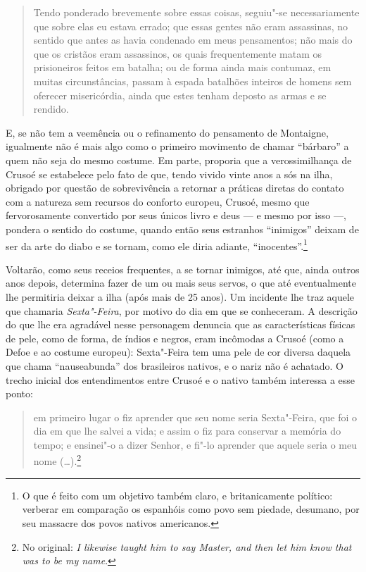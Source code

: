\begin{quote}
Tendo ponderado brevemente sobre essas coisas, seguiu"-se necessariamente
que sobre elas eu estava errado; que essas gentes não eram assassinas,
no sentido que antes as havia condenado em meus pensamentos; não mais do
que os cristãos eram assassinos, os quais frequentemente matam os
prisioneiros feitos em batalha; ou de forma ainda mais contumaz, em
muitas circunstâncias, passam à espada batalhões inteiros de homens sem
oferecer misericórdia, ainda que estes tenham deposto as armas e se
rendido.
\end{quote}

E, se não tem a veemência ou o refinamento do pensamento de Montaigne,
igualmente não é mais algo como o primeiro movimento de chamar
``bárbaro'' a quem não seja do mesmo costume. Em parte, proporia que a
verossimilhança de Crusoé se estabelece pelo fato de que, tendo vivido
vinte anos a sós na ilha, obrigado por questão de sobrevivência a
retornar a práticas diretas do contato com a natureza sem recursos do
conforto europeu, Crusoé, mesmo que fervorosamente convertido por seus
únicos livro e deus --- e mesmo por isso ---, pondera o sentido do
costume, quando então seus estranhos ``inimigos'' deixam de ser da arte
do diabo e se tornam, como ele diria adiante, ``inocentes''.\footnote{O
  que é feito com um objetivo também claro, e britanicamente político:
  verberar em comparação os espanhóis como povo sem piedade, desumano,
  por seu massacre dos povos nativos americanos.}

Voltarão, como seus receios frequentes, a se tornar inimigos, até que,
ainda outros anos depois, determina fazer de um ou mais seus servos, o
que até eventualmente lhe permitiria deixar a ilha (após mais de 25
anos). Um incidente lhe traz aquele que chamaria \emph{Sexta"-Feira}, por
motivo do dia em que se conheceram. A descrição do que lhe era agradável
nesse personagem denuncia que as características físicas de pele, como
de forma, de índios e negros, eram incômodas a Crusoé (como a Defoe e ao
costume europeu): Sexta"-Feira tem uma pele de cor diversa daquela que
chama ``nauseabunda'' dos brasileiros nativos, e o nariz não é achatado.
O trecho inicial dos entendimentos entre Crusoé e o nativo também
interessa a esse ponto:

\begin{quote}
em primeiro lugar o fiz aprender que seu nome seria Sexta"-Feira, que foi
o dia em que lhe salvei a vida; e assim o fiz para conservar a memória
do tempo; e ensinei"-o a dizer Senhor, e fi"-lo aprender que aquele seria
o meu nome (\ldots{}).\footnote{No original: \emph{I likewise taught him to
  say Master, and then let him know that was to be my name}.}
\end{quote}

